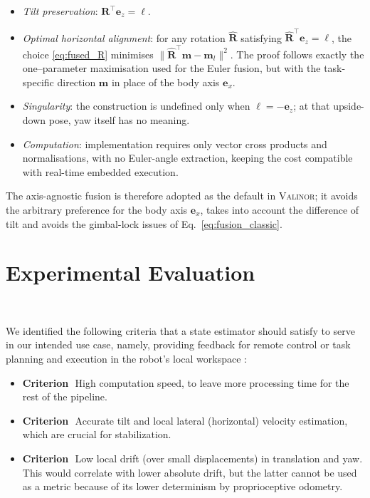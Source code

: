 \documentclass{IJCAS}
\newcommand{\critnum}[1]{\tikz[baseline=(char.base)]{
            \node[shape=circle,draw,inner sep=1pt](char){\textbf{#1}};}}
\begin{document}
\begin{itemize}[leftmargin=0em]
  \item \emph{Tilt preservation}:  
        \(\boldsymbol{R}^{\top}\boldsymbol{e}_{z}=\boldsymbol{\ell}\).

  \item \emph{Optimal horizontal alignment}:  
        for any rotation \(\hat{\boldsymbol{R}}\) satisfying
        \(\hat{\boldsymbol{R}}^{\top}\boldsymbol{e}_{z}=\boldsymbol{\ell}\),
        the choice \eqref{eq:fused_R} minimises $\bigl\|
             \hat{\boldsymbol{R}}^{\top}\boldsymbol{m}-\boldsymbol{m}_{l}
          \bigr\|^{2}$.
        The proof follows exactly the one–parameter maximisation used
        for the Euler fusion, but with the task-specific direction
        \(\boldsymbol{m}\) in place of the body axis
        \(\boldsymbol{e}_{x}\).

  \item \emph{Singularity}:  
        the construction is undefined only when
        \(\boldsymbol{\ell}=-\boldsymbol{e}_{z}\); at that upside-down
        pose, yaw itself has no meaning.

  \item \emph{Computation}:  
        implementation requires only vector cross products and
        normalisations, with no Euler-angle extraction, keeping the cost
        compatible with real-time embedded execution.
\end{itemize}

The axis-agnostic fusion is therefore adopted as the default in {\scshape Valinor}; it avoids the arbitrary preference for the body axis \(\boldsymbol{e}_{x}\), takes into account the difference of tilt and avoids the gimbal-lock issues of Eq.~\eqref{eq:fusion_classic}. 





\section{Experimental Evaluation}~\label{sec:exps}

We identified the following criteria that a state estimator should satisfy to serve in our intended use case, namely, providing feedback for remote control \cite{Grandia2024DesignControlBipedalRoboticCharacter} or task planning and execution in the robot's local workspace \cite{Tsuru2023OnlineMulticontactReplanningHumanoid}:
\begin{itemize}[label={}, leftmargin=1em]
  \item \textbf{Criterion}\,\critnum{1}\, High computation speed, to leave more processing time for the rest of the pipeline.
  \item \textbf{Criterion}\,\critnum{2}\, Accurate tilt and local lateral (horizontal) velocity estimation, which are crucial for stabilization.
  \item \textbf{Criterion}\,\critnum{3}\, Low local drift (over small displacements) in translation and yaw. This would correlate with lower absolute drift, but the latter cannot be used as a metric because of its lower determinism by proprioceptive odometry.
\end{itemize}
\end{document}
